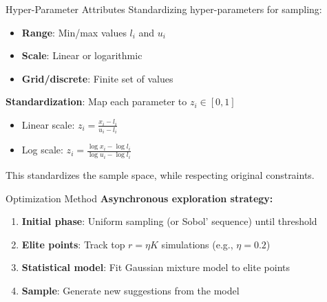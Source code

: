 \documentclass{beamer}
\begin{document}
\begin{frame}{Hyper-Parameter Attributes}
    Standardizing hyper-parameters for sampling:
    \begin{itemize}
        \item \textbf{Range}: Min/max values $l_i$ and $u_i$
        \item \textbf{Scale}: Linear or logarithmic
        \item \textbf{Grid/discrete}: Finite set of values
    \end{itemize}

    \vspace{0.3cm}
    \textbf{Standardization}: Map each parameter to $z_i \in [0,1]$
    \begin{itemize}
        \item Linear scale: $z_i = \frac{x_i-l_i}{u_i-l_i}$
        \item Log scale: $z_i = \frac{\log x_i-\log l_i}{\log u_i- \log l_i}$
    \end{itemize}

    This standardizes the sample space, while respecting original constraints.
\end{frame}

\begin{frame}{Optimization Method}
    \textbf{Asynchronous exploration strategy:}
    \begin{enumerate}
        \item \textbf{Initial phase}: Uniform sampling (or Sobol' sequence) until threshold
        \item \textbf{Elite points}: Track top $r = \eta K$ simulations (e.g., $\eta = 0.2$)
        \item \textbf{Statistical model}: Fit Gaussian mixture model to elite points
        \item \textbf{Sample}: Generate new suggestions from the model
    \end{enumerate}
\end{frame}
\end{document}
